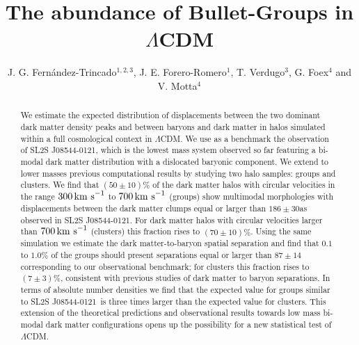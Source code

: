 \documentclass{emulateapj}
\newcommand{\hkpc}{{\ifmmode{h^{-1}{\rm kpc}}\else{$h^{-1}$kpc }\fi}}
\newcommand{\kms}{{\ifmmode{{\mathrm{\,km\ s}^{-1}}}\else{\,km~s$^{-1}$}\fi}}
\newcommand{\bullg}{SL2S J08544-0121}
\begin{document}
 

\title{The abundance of Bullet-Groups in $\Lambda$CDM}
\author{J. G. Fern\'andez-Trincado$^{1,2,3}$, J. E. Forero-Romero$^1$,
  T. Verdugo$^3$, G. Foex$^4$ and V. Motta$^4$} 
\begin{abstract}

We estimate the expected distribution of displacements between the two
dominant dark matter density peaks and between baryons and dark matter
in halos simulated within a full cosmological context in $\Lambda$CDM.
We use as a benchmark the observation of \bullg, which is the lowest mass system observed so far
featuring a bi-modal dark matter distribution with a dislocated
baryonic component. We extend to lower masses previous computational results by
studying two halo samples: groups and clusters. We find that $(50 \pm
10)\%$ of the dark matter halos with circular velocities in the range
$300\kms$ to $700\kms$ (groups) show multimodal morphologies with
displacements between the dark matter clumps equal or larger than
$186 \pm 30$\hkpc as observed in \bullg. For dark matter halos with
circular velocities larger than $700\kms$ (clusters) this fraction
rises to $(70 \pm 10)\%$. Using the same simulation we estimate the
dark matter-to-baryon spatial separation and find that $0.1$ to
$1.0\%$ of the groups should present separations equal or
larger than $87\pm 14$\hkpc corresponding to our observational
benchmark; for clusters this fraction rises to $(7\pm 3)\%$, consistent
with previous studies of dark matter to baryon separations. In terms
of absolute number densities we find that the expected value for
groups similar to \bullg\ is three times larger than the expected value
for clusters. This extension of the theoretical predictions and
observational results towards low mass bi-modal dark matter
configurations opens up the possibility for a new statistical test of
$\Lambda$CDM.   
\end{abstract}
\end{document}
